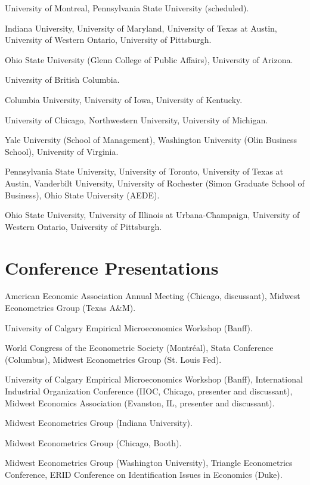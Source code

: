 \documentclass[10pt,letterpaper]{article}
\begin{document}
\begin{description}[font=\mdseries]
\item[2018]
  University of Montreal,
  Pennsylvania State University (scheduled).
\item[2017]
  Indiana University,
  University of Maryland,
  University of Texas at Austin,
  University of Western Ontario,
  University of Pittsburgh.
\item[2016]
  Ohio State University (Glenn College of Public Affairs),
  University of Arizona.
\item[2015]
  University of British Columbia.
\item[2014]
  Columbia University,
  University of Iowa,
  University of Kentucky.
\item[2013]
  University of Chicago,
  Northwestern University,
  University of Michigan.
\item[2012]
  Yale University (School of Management),
  Washington University (Olin Business School),
  University of Virginia.
\item[2011]
  Pennsylvania State University,
  University of Toronto,
  University of Texas at Austin,
  Vanderbilt University,
  University of Rochester (Simon Graduate School of Business),
  Ohio State University (AEDE).
\item[2010]
  Ohio State University,
  University of Illinois at Urbana-Champaign,
  University of Western Ontario,
  University of Pittsburgh.
\end{description}

\section*{Conference Presentations}

\begin{description}[font=\mdseries]
\item[2017]
  American Economic Association Annual Meeting (Chicago, discussant),
  Midwest Econometrics Group (Texas A\&M).
\item[2016]
  University of Calgary Empirical Microeconomics Workshop (Banff).
\item[2015]
  World Congress of the Econometric Society (Montr\'{e}al),
  Stata Conference (Columbus),
  Midwest Econometrics Group (St. Louis Fed).
\item[2014]
  University of Calgary Empirical Microeconomics Workshop (Banff),
  International Industrial Organization Conference (IIOC, Chicago, presenter and discussant),
  Midwest Economics Association (Evanston, IL, presenter and discussant).
\item[2013]
  Midwest Econometrics Group (Indiana University).
\item[2011]
  Midwest Econometrics Group (Chicago, Booth).
\item[2010]
  Midwest Econometrics Group (Washington University),
  Triangle Econometrics Conference,
  ERID Conference on Identification Issues in Economics (Duke).
\end{description}
\end{document}
